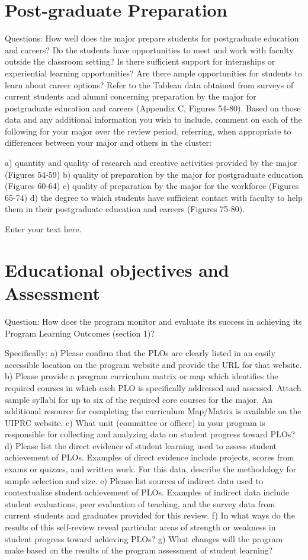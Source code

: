 \documentclass[12pt]{article}
\begin{document}
\section{Post-graduate Preparation}
Questions: How well does the major prepare students for postgraduate education and careers? Do the students have opportunities to meet and work with faculty outside the classroom setting? Is there sufficient support for internships or experiential learning opportunities? Are there ample opportunities for students to learn about career options?  
Refer to the Tableau data obtained from surveys of current students and alumni concerning preparation by the major for postgraduate education and careers (Appendix C, Figures 54-80). Based on those data and any additional information you wish to include, comment on each of the following for your major over the review period, referring, when appropriate to differences between your major and others in the cluster:

    a) quantity and quality of research and creative activities provided by the major (Figures 54-59)
    b) quality of preparation by the major for postgraduate education (Figures 60-64)
    c) quality of preparation by the major for the workforce (Figures 65-74)
    d) the degree to which students have sufficient contact with faculty to help them in their postgraduate education and careers (Figures 75-80).

Enter your text here.

\section{Educational objectives and Assessment}

Question: How does the program monitor and evaluate its success in achieving its Program  Learning Outcomes (section 1)?  

Specifically:
    a) Please confirm that the PLOs are clearly listed in an easily accessible location on the program website and provide the URL for that website.
    b) Please provide a program curriculum matrix or map which identifies the required courses in which each PLO is specifically addressed and assessed. Attach sample syllabi for up to six of the required core courses for the major. An additional resource for completing the curriculum Map/Matrix is available on the UIPRC website.
    c) What unit (committee or officer) in your program is responsible for collecting and analyzing data on student progress toward PLOs?
    d) Please list the direct evidence of student learning used to assess student achievement of PLOs. Examples of direct evidence include projects, scores from exams or quizzes, and written work. For this data, describe the methodology for sample selection and size.  
    e) Please list sources of indirect data used to contextualize student achievement of PLOs. Examples of indirect data include student evaluations, peer evaluation of teaching, and the survey data from current students and graduates provided for this review.
    f) In what ways do the results of this self-review reveal particular areas of strength or weakness in student progress toward achieving PLOs?
    g) What changes will the program make based on the results of the program assessment of student learning?
\end{document}
